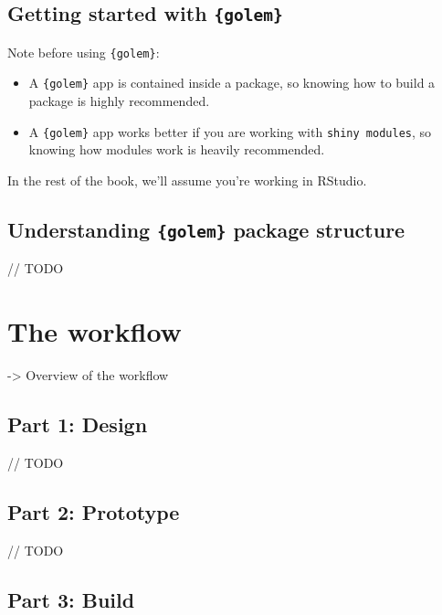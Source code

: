\documentclass[]{book}
\begin{document}
\hypertarget{getting-started-with-golem}{%
\section{\texorpdfstring{Getting started with \texttt{\{golem\}}}{Getting started with \{golem\}}}\label{getting-started-with-golem}}

Note before using \texttt{\{golem\}}:

\begin{itemize}
\item
  A \texttt{\{golem\}} app is contained inside a package, so knowing how to build a package is highly recommended.
\item
  A \texttt{\{golem\}} app works better if you are working with \texttt{shiny\ modules}, so knowing how modules work is heavily recommended.
\end{itemize}

In the rest of the book, we'll assume you're working in RStudio.

\hypertarget{understanding-golem-package-structure}{%
\section{\texorpdfstring{Understanding \texttt{\{golem\}} package structure}{Understanding \{golem\} package structure}}\label{understanding-golem-package-structure}}

// TODO

\hypertarget{workflow}{%
\chapter{The workflow}\label{workflow}}

-\textgreater{} Overview of the workflow

\hypertarget{part-1-design}{%
\section{Part 1: Design}\label{part-1-design}}

// TODO

\hypertarget{part-2-prototype}{%
\section{Part 2: Prototype}\label{part-2-prototype}}

// TODO

\hypertarget{part-3-build}{%
\section{Part 3: Build}\label{part-3-build}}
\end{document}
